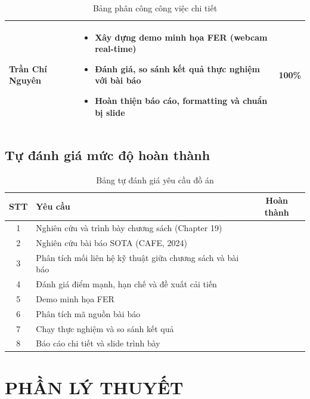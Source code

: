 \documentclass[12pt,a4paper]{article}
\newcommand{\cmark}{\ding{51}}
\let\oldtextbf\textbf
\renewcommand{\textbf}[1]{\oldtextbf{\textcolor{hcmublue}{#1}}}
\begin{document}
\begin{table}[H]
\begin{tabularx}{\textwidth}{|l|X|c|}
\textbf{Trần Chí Nguyên} &
\begin{minipage}[t]{\linewidth}
\begin{itemize}[leftmargin=*,nosep,after=\strut]
    \item[-] Xây dựng demo minh họa FER (webcam real-time)
    \item[-] Đánh giá, so sánh kết quả thực nghiệm với bài báo
    \item[-] Hoàn thiện báo cáo, formatting và chuẩn bị slide
\end{itemize}
\end{minipage} & 100\% \\ \hline

\end{tabularx}
\caption{Bảng phân công công việc chi tiết}
\label{tab:work_distribution}
\end{table}

\subsection{Tự đánh giá mức độ hoàn thành}

\begin{table}[H]
\centering
\begin{tabular}{|c|p{9cm}|c|}
\hline
\textbf{STT} & \textbf{Yêu cầu} & \textbf{Hoàn thành} \\ \hline
1 & Nghiên cứu và trình bày chương sách (Chapter 19) & \cmark \\ \hline
2 & Nghiên cứu bài báo SOTA (CAFE, 2024) & \cmark \\ \hline
3 & Phân tích mối liên hệ kỹ thuật giữa chương sách và bài báo & \cmark \\ \hline
4 & Đánh giá điểm mạnh, hạn chế và đề xuất cải tiến & \cmark \\ \hline
5 & Demo minh họa FER & \cmark \\ \hline
6 & Phân tích mã nguồn bài báo & \cmark \\ \hline
7 & Chạy thực nghiệm và so sánh kết quả & \cmark \\ \hline
8 & Báo cáo chi tiết và slide trình bày & \cmark \\ \hline
\end{tabular}
\caption{Bảng tự đánh giá yêu cầu đồ án}
\label{tab:self_eval}
\end{table}


\section{PHẦN LÝ THUYẾT}
\end{document}
